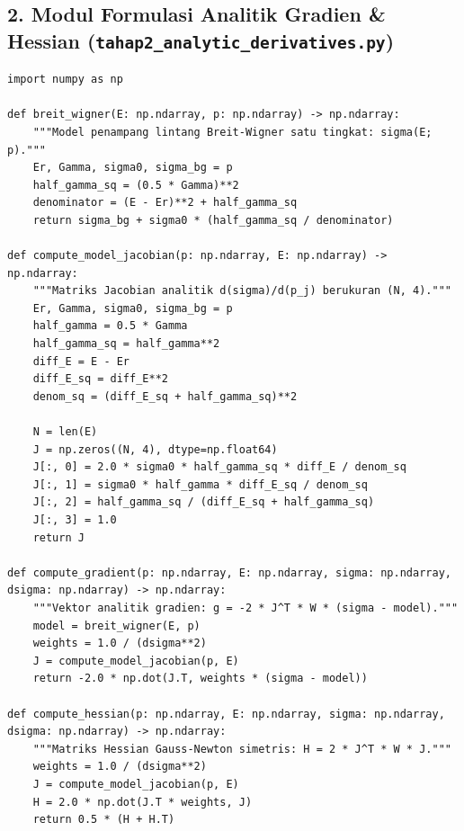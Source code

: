 \subsection*{2. Modul Formulasi Analitik Gradien \& Hessian (\texttt{tahap2\_analytic\_derivatives.py})}
\begin{lstlisting}[caption={Model Breit-Wigner, Jacobian, Gradien, dan Hessian Gauss-Newton analitik.}]
import numpy as np

def breit_wigner(E: np.ndarray, p: np.ndarray) -> np.ndarray:
    """Model penampang lintang Breit-Wigner satu tingkat: sigma(E; p)."""
    Er, Gamma, sigma0, sigma_bg = p
    half_gamma_sq = (0.5 * Gamma)**2
    denominator = (E - Er)**2 + half_gamma_sq
    return sigma_bg + sigma0 * (half_gamma_sq / denominator)

def compute_model_jacobian(p: np.ndarray, E: np.ndarray) -> np.ndarray:
    """Matriks Jacobian analitik d(sigma)/d(p_j) berukuran (N, 4)."""
    Er, Gamma, sigma0, sigma_bg = p
    half_gamma = 0.5 * Gamma
    half_gamma_sq = half_gamma**2
    diff_E = E - Er
    diff_E_sq = diff_E**2
    denom_sq = (diff_E_sq + half_gamma_sq)**2
    
    N = len(E)
    J = np.zeros((N, 4), dtype=np.float64)
    J[:, 0] = 2.0 * sigma0 * half_gamma_sq * diff_E / denom_sq
    J[:, 1] = sigma0 * half_gamma * diff_E_sq / denom_sq
    J[:, 2] = half_gamma_sq / (diff_E_sq + half_gamma_sq)
    J[:, 3] = 1.0
    return J

def compute_gradient(p: np.ndarray, E: np.ndarray, sigma: np.ndarray, dsigma: np.ndarray) -> np.ndarray:
    """Vektor analitik gradien: g = -2 * J^T * W * (sigma - model)."""
    model = breit_wigner(E, p)
    weights = 1.0 / (dsigma**2)
    J = compute_model_jacobian(p, E)
    return -2.0 * np.dot(J.T, weights * (sigma - model))

def compute_hessian(p: np.ndarray, E: np.ndarray, sigma: np.ndarray, dsigma: np.ndarray) -> np.ndarray:
    """Matriks Hessian Gauss-Newton simetris: H = 2 * J^T * W * J."""
    weights = 1.0 / (dsigma**2)
    J = compute_model_jacobian(p, E)
    H = 2.0 * np.dot(J.T * weights, J)
    return 0.5 * (H + H.T)
\end{lstlisting}

